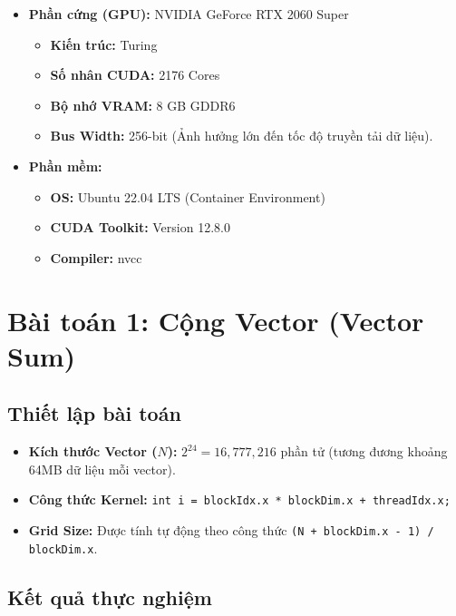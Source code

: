\documentclass{article}
\begin{document}
    \begin{itemize}
        \item \textbf{Phần cứng (GPU):} NVIDIA GeForce RTX 2060 Super
        \begin{itemize}
            \item \textbf{Kiến trúc:} Turing
            \item \textbf{Số nhân CUDA:} 2176 Cores
            \item \textbf{Bộ nhớ VRAM:} 8 GB GDDR6
            \item \textbf{Bus Width:} 256-bit (Ảnh hưởng lớn đến tốc độ truyền tải dữ liệu).
        \end{itemize}
        \item \textbf{Phần mềm:}
        \begin{itemize}
            \item \textbf{OS:} Ubuntu 22.04 LTS (Container Environment)
            \item \textbf{CUDA Toolkit:} Version 12.8.0
            \item \textbf{Compiler:} nvcc
        \end{itemize}
    \end{itemize}

    \section{Bài toán 1: Cộng Vector (Vector Sum)}

    \subsection{Thiết lập bài toán}

    \begin{itemize}
        \item \textbf{Kích thước Vector ($N$):} $2^{24} = 16{,}777{,}216$ phần tử (tương đương khoảng 64MB dữ liệu mỗi vector).
        \item \textbf{Công thức Kernel:} \lstinline|int i = blockIdx.x * blockDim.x + threadIdx.x;|
        \item \textbf{Grid Size:} Được tính tự động theo công thức \lstinline|(N + blockDim.x - 1) / blockDim.x|.
    \end{itemize}

    \subsection{Kết quả thực nghiệm}
\end{document}
